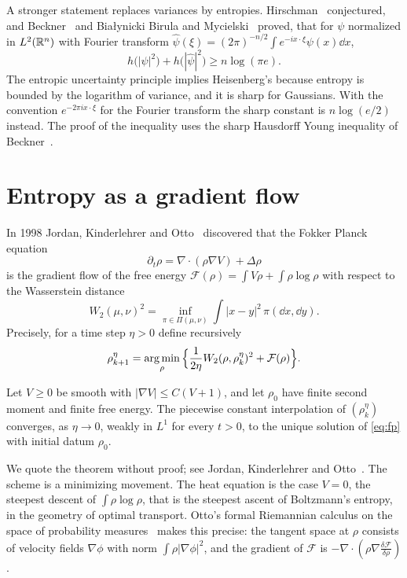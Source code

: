 A stronger statement replaces variances by entropies. Hirschman~\cite{hirschman1957} conjectured, and Beckner~\cite{beckner1975} and Bia\l{}ynicki Birula and Mycielski~\cite{bbm1975} proved, that for $\psi$ normalized in $L^2(\mathbb{R}^n)$ with Fourier transform $\hat\psi(\xi) = (2\pi)^{-n/2}\int e^{-ix\cdot\xi}\psi(x)\dd x$,
\[
h\big(|\psi|^2\big)+h\big(|\hat\psi|^2\big)\geq n\log(\pi e).
\]
The entropic uncertainty principle implies Heisenberg's because entropy is bounded by the logarithm of variance, and it is sharp for Gaussians. With the convention $e^{-2\pi ix\cdot\xi}$ for the Fourier transform the sharp constant is $n\log(e/2)$ instead. The proof of the inequality uses the sharp Hausdorff Young inequality of Beckner~\cite{beckner1975}.

\section{Entropy as a gradient flow}

In 1998 Jordan, Kinderlehrer and Otto~\cite{jko1998} discovered that the Fokker Planck equation
\begin{equation}
\partial_t\rho = \nabla\cdot(\rho\nabla V)+\Delta\rho
\label{eq:fp}
\end{equation}
is the gradient flow of the free energy $\mathcal{F}(\rho) = \int V\rho+\int\rho\log\rho$ with respect to the Wasserstein distance
\[
W_2(\mu,\nu)^2 = \inf_{\pi\in\Pi(\mu,\nu)}\int|x-y|^2\,\pi(\dd x,\dd y).
\]
Precisely, for a time step $\eta>0$ define recursively
\[
\rho_{k+1}^\eta = \operatorname*{arg\,min}_\rho\Big\{\frac{1}{2\eta}W_2(\rho,\rho_k^\eta)^2+\mathcal{F}(\rho)\Big\}.
\]

\begin{theorem}
\label{thm:jko}
Let $V\geq0$ be smooth with $|\nabla V|\leq C(V+1)$, and let $\rho_0$ have finite second moment and finite free energy. The piecewise constant interpolation of $(\rho^\eta_k)$ converges, as $\eta\to0$, weakly in $L^1$ for every $t>0$, to the unique solution of \eqref{eq:fp} with initial datum $\rho_0$.
\end{theorem}

We quote the theorem without proof; see Jordan, Kinderlehrer and Otto~\cite[Theorem~5.1]{jko1998}. The scheme is a minimizing movement. The heat equation is the case $V = 0$, the steepest descent of $\int\rho\log\rho$, that is the steepest ascent of Boltzmann's entropy, in the geometry of optimal transport. Otto's formal Riemannian calculus on the space of probability measures~\cite{otto2001} makes this precise: the tangent space at $\rho$ consists of velocity fields $\nabla\phi$ with norm $\int\rho|\nabla\phi|^2$, and the gradient of $\mathcal{F}$ is $-\nabla\cdot(\rho\nabla\frac{\delta\mathcal{F}}{\delta\rho})$.

